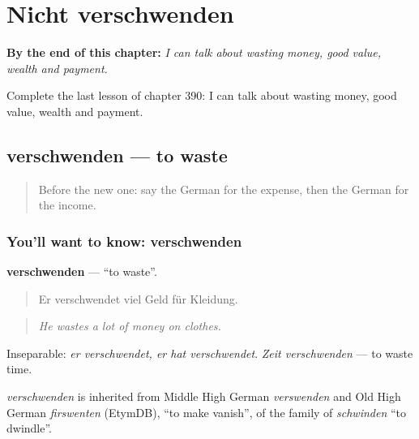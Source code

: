
\chapter{Nicht verschwenden}
\label{ch:ge-nicht-verschwenden}

\begin{chapteropening}
\textbf{By the end of this chapter:} \emph{I can talk about wasting money, good value, wealth and payment.}

Complete the last lesson of chapter 390: I can talk about wasting money, good value, wealth and payment.
\end{chapteropening}

\section[verschwenden]{verschwenden — to waste}

\label{lesson:GE-C390-verschwenden}



\begin{quote}
Before the new one: say the German for the expense, then the German for the income.
\end{quote}

\subsection*{You'll want to know: verschwenden}
\textbf{verschwenden} — \textquotedblleft{}to waste\textquotedblright{}.

\begin{quote}
Er verschwendet viel Geld für Kleidung.
\end{quote}

\begin{quote}
\emph{He wastes a lot of money on clothes.}
\end{quote}

Inseparable: \emph{er verschwendet, er hat verschwendet}. \emph{Zeit verschwenden} — to waste time.

\begin{cousinweb}
\emph{verschwenden} is inherited from Middle High German \emph{verswenden} and Old High German \emph{firswenten} (EtymDB), \textquotedblleft{}to make vanish\textquotedblright{}, of the family of \emph{schwinden} \textquotedblleft{}to dwindle\textquotedblright{}.
\end{cousinweb}

